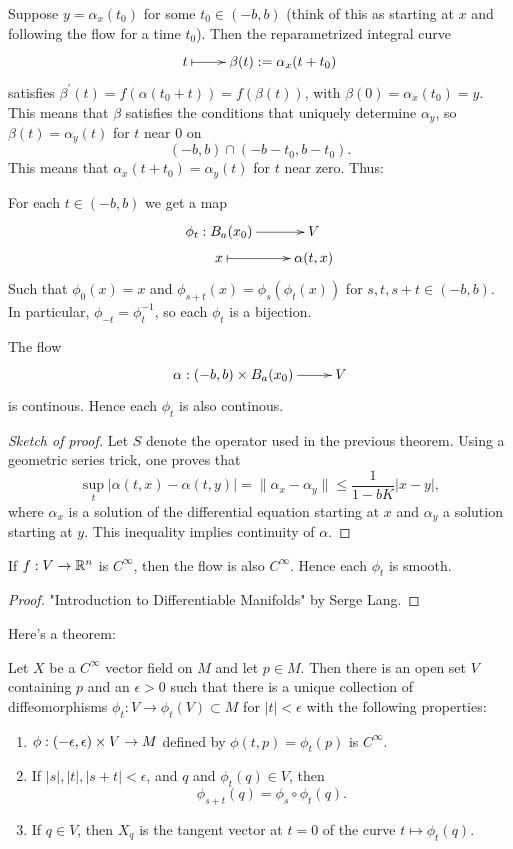 \documentclass[11pt, english]{article}
\begin{document}
Suppose $y=\alpha_x(t_0)$ for some $t_0 \in (-b,b)$ (think of this as starting at $x$ and following the flow for a time $t_0$). Then the reparametrized integral curve
\[
\xymatrix@R=3pt{
t \ar@{|->}[r] & \beta(t) := \alpha_x(t+t_0)
}
\]
satisfies $\beta^\prime(t)= f(\alpha(t_0+t))=f(\beta(t))$, with $\beta(0)=\alpha_x(t_0)=y$. This means that $\beta$ satisfies the conditions that uniquely determine $\alpha_y$, so $\beta(t)=\alpha_y(t)$ for $t$ near $0$ on 
\[
(-b,b) \cap (-b-t_0, b-t_0).
\]
This means that $\alpha_x(t+t_0)=\alpha_y(t)$ for $t$ near zero. Thus:
\begin{prop}
For each $t \in (-b,b)$ we get a map
\[
\xymatrix@R=3pt{
\phi_t:B_a(x_0) \ar[r]& V \\
x \ar@{|->}[r] & \alpha(t,x)
}
\]
Such that $\phi_0(x)=x$ and $\phi_{s+t}(x)=\phi_s(\phi_t(x))$ for $s,t,s+t \in (-b,b)$. In particular, $\phi_{-t}=\phi_t^{-1}$, so each $\phi_t$ is a bijection.
\end{prop}

\begin{thm}
The flow
\[
\xymatrix@R=3pt{
\alpha:(-b,b) \times B_a(x_0) \ar[r] &  V
}
\]
is continous. Hence each $\phi_t$ is also continous. 
\end{thm}
\begin{proof}[Sketch of proof]
Let $S$ denote the operator used in the previous theorem. Using a geometric series trick, one proves that 
\[
\sup_t |\alpha(t,x)-\alpha(t,y)| = \| \alpha_x - \alpha_y \| \leq \frac{1}{1-bK} |x-y|,
\]
where $\alpha_x$ is a solution of the differential equation starting at $x$ and $\alpha_y$ a solution starting at $y$. This inequality implies continuity of $\alpha$.
\end{proof}

\begin{prop}
If $f: V \to \mathbb{R}^n$ is $C^\infty$, then the flow is also $C^\infty$. Hence each $\phi_t$ is smooth.
\end{prop}
\begin{proof}"Introduction to Differentiable Manifolds" by Serge Lang.
\end{proof}


Here's a theorem:
\begin{thm}
Let $X$ be a $C^\infty$ vector field on $M$ and let $p \in M$. Then there is an open set $V$ containing $p$ and an $\epsilon > 0$ such that there is a unique collection of diffeomorphisms $\phi_t: V \to \phi_t(V) \subset M$ for $|t| < \epsilon$ with the following properties:
\begin{enumerate}
\item $\phi:(-\epsilon,\epsilon) \times V \to M$ defined by $\phi(t,p)=\phi_t(p)$ is $C^\infty$.
\item If $|s|,|t|,|s+t| < \epsilon$, and $q$ and $\phi_t(q) \in V$, then
\[
\phi_{s+t}(q) = \phi_s \circ \phi_t(q).
\]
\item If $q \in V$, then $X_q$ is the tangent vector at $t=0$ of the curve $t \mapsto \phi_t(q)$.
\end{enumerate}
\end{thm}
\end{document}
